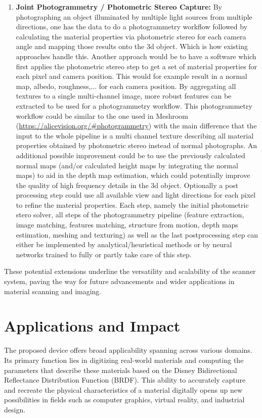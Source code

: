 \documentclass[11pt, twoside, listof=totocnumbered, bibliography=totocnumbered]{scrartcl}
\begin{document}
\begin{enumerate}
	\item \textbf{Joint Photogrammetry / Photometric Stereo Capture:} By photographing an object illuminated by multiple light sources from multiple directions, one has the data to do a photogrammetry workflow followed by calculating the material properties via photometric stereo for each camera angle and mapping those results onto the 3d object. Which is how existing approaches handle this. Another approach would be to have a software which first applies the photometric stereo step to get a set of material properties for each pixel and camera position. This would for example result in a normal map, albedo, roughness,... for each camera position. By aggregating all textures to a single multi-channel image, more robust features can be extracted to be used for a photogrammetry workflow. This photogrammetry workflow could be similar to the one used in Meshroom (\href{https://alicevision.org/\#photogrammetry}{https://alicevision.org/\#photogrammetry}) with the main difference that the input to the whole pipeline is a multi channel texture describing all material properties obtained by photometric stereo instead of normal photographs. An additional possible improvement could be to use the previously calculated normal maps (and/or calculated height maps by integrating the normal maps) to aid in the depth map estimation, which could potentially improve the quality of high frequency details in the 3d object. Optionally a post processing step could use all available view and light directions for each pixel to refine the material properties. Each step, namely the initial photometric stero solver, all steps of the photogrammetry pipeline (feature extraction, image matching, features matching, structure from motion, depth maps estimation, meshing and texturing) as well as the last postprocessing step can either be implemented by analytical/heuristical methods or by neural networks trained to fully or partly take care of this step.
\end{enumerate}

These potential extensions underline the versatility and scalability of the scanner system, paving the way for future advancements and wider applications in material scanning and imaging.

\section{Applications and Impact}
The proposed device offers broad applicability spanning across various domains. Its primary function lies in digitizing real-world materials and computing the parameters that describe these materials based on the Disney Bidirectional Reflectance Distribution Function (BRDF).\cite{DISNEY_BRDF} This ability to accurately capture and recreate the physical characteristics of a material digitally opens up new possibilities in fields such as computer graphics, virtual reality, and industrial design.
\end{document}
